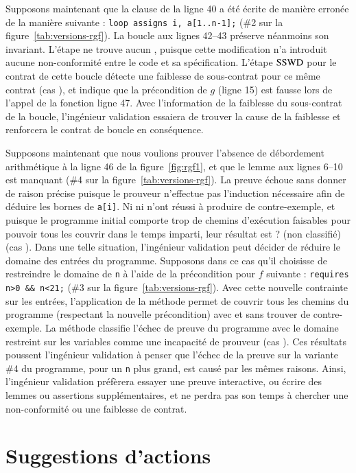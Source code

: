 Supposons maintenant que la clause de la ligne 40 a été écrite de manière
erronée de la manière suivante : \lstinline'loop assigns i, a[1..n-1];' (\#2 sur
la figure~\ref{tab:versions-rgf}).
La boucle aux lignes 42--43 préserve néanmoins son invariant.
L'étape \NCD ne trouve aucun \NCCE, puisque cette modification n'a introduit
aucune non-conformité entre le code et sa spécification.
L'étape $\mathrm{SSWD}$ pour le contrat de cette boucle détecte une faiblesse de
sous-contrat pour ce même contrat (cas ), et indique que la
précondition de $g$ (ligne 15) est fausse lors de l'appel de la fonction
ligne 47.
Avec l'information de la faiblesse du sous-contrat de la boucle, l'ingénieur
validation essaiera de trouver la cause de la faiblesse et renforcera le contrat
de boucle en conséquence.

Supposons maintenant que nous voulions prouver l'absence de débordement
arithmétique à la ligne 46 de la figure~\ref{fig:rgf1}, et que le lemme aux
lignes 6--10 est manquant (\#4 sur la figure~\ref{tab:versions-rgf}).
La preuve échoue sans donner de raison précise puisque le prouveur n'effectue
pas l'induction nécessaire afin de déduire les bornes de \lstinline'a[i]'.
Ni \NCD ni \SWD n'ont réussi à produire de contre-exemple, et puisque le
programme initial comporte trop de chemins d'exécution faisables pour pouvoir
tous les couvrir dans le temps imparti, leur résultat est \textsf{?}
(non classifié) (cas ).
Dans une telle situation, l'ingénieur validation peut décider de réduire le
domaine des entrées du programme.
Supposons dans ce cas qu'il choisisse de restreindre le domaine de
\lstinline'n' à l'aide de la précondition pour $f$ suivante :
\lstinline'requires n>0 && n<21;' (\#3 sur la figure~\ref{tab:versions-rgf}).
Avec cette nouvelle contrainte sur les entrées, l'application de la méthode
permet de couvrir tous les chemins du programme (respectant la nouvelle
précondition) avec \NCD et \SWD sans trouver de contre-exemple.
La méthode classifie l'échec de preuve du programme avec le domaine restreint
sur les variables comme une incapacité de prouveur (cas ).
Ces résultats poussent l'ingénieur validation à penser que l'échec de la preuve
sur la variante \#4 du programme, pour un \lstinline'n' plus grand, est causé
par les mêmes raisons.
Ainsi, l'ingénieur validation préfèrera essayer une preuve interactive, ou
écrire des lemmes ou assertions supplémentaires, et ne perdra pas son temps à
chercher une non-conformité ou une faiblesse de contrat.


\section{Suggestions d'actions}
\label{sec:method-suggestions}


